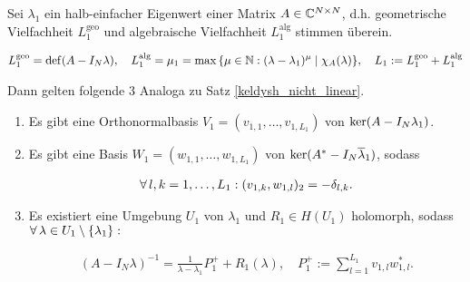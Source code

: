 \begin{theorem} \label{keldysh_linear}
    
    Sei $\lambda_1$ ein halb-einfacher Eigenwert einer Matrix $A \in \mathbb{C}^{N \times N}$, d.h. geometrische Vielfachheit $L_1^\mathrm{geo}$ und algebraische Vielfachheit $L_1^\mathrm{alg}$ stimmen überein.

    \begin{align*}
        L_1^\mathrm{geo} = \operatorname{def}(A - I_N \lambda),
        \quad
        L_1^\mathrm{alg} = \mu_1 = \max {\left \{ \mu \in \mathbb{N}: (\lambda - \lambda_1)^\mu \mid \chi_A(\lambda) \right \}},
        \quad
        L_1 := L_1^\mathrm{geo} + L_1^\mathrm{alg}
    \end{align*}

    Dann gelten folgende $3$ Analoga zu Satz \ref{keldysh_nicht_linear}.

    \begin{enumerate}[label = (\roman*)]

        \item Es gibt eine Orthonormalbasis $V_1 = (v_{1, 1}, \dots, v_{1, L_1})$ von $\operatorname{ker}(A - I_N \lambda_1)$.

        \item Es gibt eine Basis $W_1 = (w_{1, 1}, \dots, w_{1, L_1})$ von $\operatorname{ker}(A^\ast - I_N \overline \lambda_1)$, sodass
        
        \begin{align*}
            \forall \, l, k = 1, \dots, L_1:
            (v_{1, k}, w_{1, l})_2 = -\delta_{l, k}.
        \end{align*}

        \item Es existiert eine Umgebung $U_1$ von $\lambda_1$ und $R_1 \in H(U_1)$ holomorph, sodass $\forall \, \lambda \in U_1 \setminus {\left \{ \lambda_1 \right \}}:$

        \begin{align*}
            (A - I_N \lambda)^{-1}
            =
            \frac{1}{\lambda - \lambda_1} P_1^+
            +
            R_1(\lambda),
            \quad
            P_1^+
            :=
            \sum_{l=1}^{L_1}
                v_{1, l} w_{1, l}^\ast.
        \end{align*}

    \end{enumerate}

\end{theorem}


